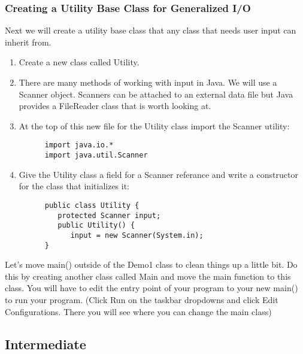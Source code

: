 \documentclass[../../main.tex]{subfiles}
\begin{document}
\subsubsection{Creating a Utility Base Class for Generalized I/O}
   \begin{steps}
      \item Next we will create a utility base class that any class that needs user input
         can inherit from.
   \begin{enumerate}[label=\Alph*.]
      \item Create a new class called Utility.
      \item There are many methods of working with input in Java. We will use a Scanner object.
         Scanners can be attached to an external data file but Java provides a FileReader class
         that is worth looking at.
      \item At the top of this new file for the Utility class import the Scanner utility:
         \begin{verbatim}
      import java.io.* 
      import java.util.Scanner
         \end{verbatim}
      \item Give the Utility class a field for a Scanner referance and write a constructor
         for the class that initializes it:
         \begin{verbatim}
      public class Utility {
         protected Scanner input;
         public Utility() {
            input = new Scanner(System.in);
      }
         \end{verbatim}
   \end{enumerate}
      \item Let's move main() outside of the Demo1 class to clean things up a little bit.
         Do this by creating another class called Main and move the main function to
         this class. You will have to edit the entry point of your program to your new main()
         to run your program. (Click Run on the taskbar dropdowns and click Edit Configurations.
         There you will see where you can change the main class)
   \end{steps}
\subsection{Intermediate}
\end{document}
